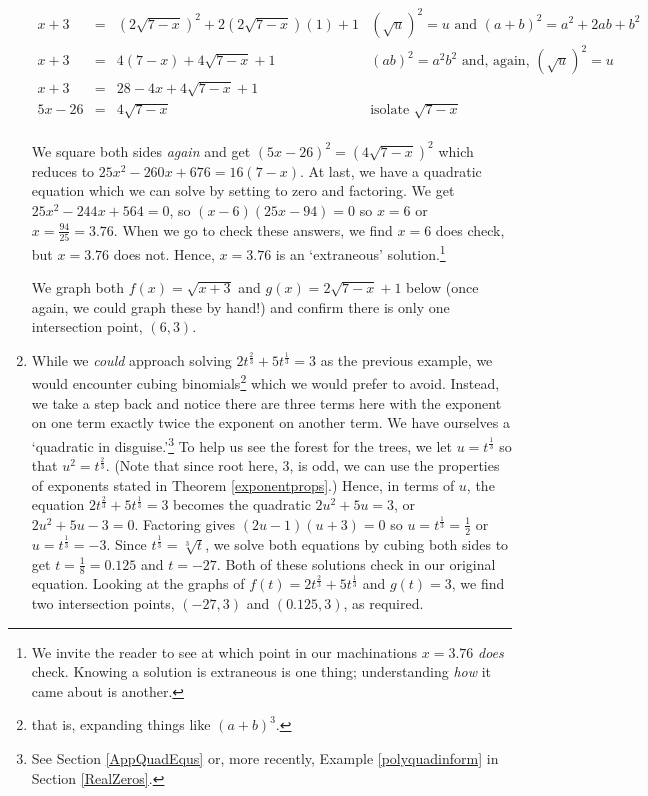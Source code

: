 \begin{ex}
\begin{enumerate}
\[\begin{array}{rclr}
 x+3 & = & (2 \sqrt{7-x})^2 + 2 (2 \sqrt{7-x})(1) + 1 & \text{$(\sqrt{u})^2 = u$ and $(a+b)^2 = a^2 + 2ab +b^2$} \\

 
 x+3 & = & 4(7-x) + 4\sqrt{7-x} + 1 &  \text{$(ab)^2 = a^2b^2$ and, again, $(\sqrt{u})^2 = u$} \\
 
 x+3 & = & 28-4x+4\sqrt{7-x} + 1 & \\
 
 5x-26 & = & 4\sqrt{7-x} & \text{isolate $\sqrt{7-x}$} \\ \end{array} \]
 
We square both sides \textit{again} and get $(5x-26)^2 = (4\sqrt{7-x})^2$ which reduces to $25x^2-260x+676 = 16(7-x)$. At last, we have a quadratic equation which we can solve by setting to zero and factoring.  We get  $25x^2-244x+564 = 0$, so $(x-6)(25x-94) = 0$ so $x = 6$ or $x = \frac{94}{25} = 3.76$.  When we go to check these answers, we find $x=6$ does check, but $x = 3.76$ does not. Hence, $x=3.76$ is an `extraneous' solution.\footnote{We invite the reader to see at which point in our machinations $x=3.76$ \textit{does} check.  Knowing a solution is extraneous is one thing;  understanding \textit{how} it came about is another.}

We graph both $f(x) = \sqrt{x+3}$ and $g(x) = 2\sqrt{7-x} + 1$ below (once again, we could graph these by hand!) and confirm there is only one intersection point, $(6,3)$.

\item  While we \textit{could} approach solving  $2t^{\frac{2}{3}} + 5t^{\frac{1}{3}} = 3$ as the previous example, we would encounter cubing binomials\footnote{that is, expanding things like $(a+b)^3$.} which we would prefer to avoid.  Instead, we take a step back and notice there are three terms here with the exponent on one term exactly twice the exponent on another term.  We have ourselves a `quadratic in disguise.'\footnote{See Section \ref{AppQuadEqus} or, more recently, Example \ref{polyquadinform} in Section \ref{RealZeros}.} To help us see the forest for the trees, we let $u = t^{\frac{1}{3}}$ so that $u^2 = t^{\frac{2}{3}}$. (Note that since root here, $3$, is odd, we can use the properties of exponents stated in Theorem \ref{exponentprops}.)  Hence, in terms of $u$, the equation   $2t^{\frac{2}{3}} + 5t^{\frac{1}{3}} = 3$ becomes the quadratic $2u^2 + 5u = 3$, or $2u^2 + 5u - 3 = 0$.  Factoring gives $(2u-1)(u+3) = 0$ so $u = t^{\frac{1}{3}} = \frac{1}{2}$ or $u = t^{\frac{1}{3}} = -3$.  Since $t^{\frac{1}{3}} = \sqrt[3]{t}$, we solve both equations by cubing both sides to get $t = \frac{1}{8} = 0.125$ and $t = -27$.  Both of these solutions check in our original equation.  Looking at the graphs of $f(t) = 2t^{\frac{2}{3}} + 5t^{\frac{1}{3}}$ and $g(t) = 3$, we find two intersection points, $(-27,3)$ and $(0.125,3)$, as required.


\end{enumerate}
\end{ex}
